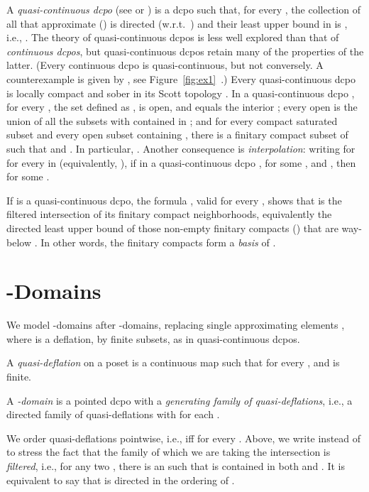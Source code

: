 \documentclass{LMCS}
\begin{document}
A {\em quasi-continuous dcpo\/}  (see \cite{GLS:quasicont} or
\cite[Definition~III-3.2]{GHKLMS:contlatt}) is a dcpo such that, for
every , the collection of all  that
approximate  () is directed (w.r.t.\ )
and their least upper bound in  is , i.e.,
.  The theory of quasi-continuous dcpos is less well explored than that
of {\em continuous dcpos\/}, but quasi-continuous dcpos retain many of
the properties of the latter.  (Every continuous dcpo is
quasi-continuous, but not conversely.  A counterexample is given by
, see Figure~\ref{fig:ex1}~.)
Every quasi-continuous dcpo  is locally compact and sober in its
Scott topology \cite[III-3.7]{GHKLMS:contlatt}.  In a quasi-continuous
dcpo , for every , the set 
defined as , is open, and equals the
interior  \cite[III-3.6(ii)]{GHKLMS:contlatt};
every open  is the union of all the subsets  with  contained in  \cite[III-5.6]{GHKLMS:contlatt}; and
for every compact saturated subset  and every open subset 
containing , there is a finitary compact subset  of 
such that  and 
\cite[III-5.7]{GHKLMS:contlatt}.
In particular, .  Another consequence is {\em
  interpolation\/}: writing  for 
for every  in  (equivalently, ),
if  in a quasi-continuous dcpo , for some , and , then  for
some .

If  is a quasi-continuous dcpo, the formula , valid
for every , shows that  is the filtered
intersection of its finitary compact neighborhoods, equivalently the
directed least upper bound of those non-empty finitary compacts  () that are way-below .  In other words, the
finitary compacts form a {\em basis\/} of .



\section{-Domains}
\label{sec:qrb}

We model -domains after -domains, replacing single
approximating elements , where  is a deflation, by
finite subsets, as in quasi-continuous dcpos.

\begin{defi}[-Domain]
  \label{defn:qrb}
  A {\em quasi-deflation\/} on a poset  is a continuous map
   such that  for
  every , and 
  is finite.

  A {\em -domain\/} is a pointed dcpo  with a {\em generating
    family of quasi-deflations\/}, i.e., a directed family of
  quasi-deflations  with  for each .
\end{defi}
We order quasi-deflations pointwise, i.e.,  iff
 for every .  Above, we write
 instead of  to stress the fact that the
family  of which we are taking the
intersection is {\em filtered\/}, i.e., for any two ,
there is an  such that  is contained
in both  and .  It is
equivalent to say that  is directed in
the  ordering of .
\end{document}
